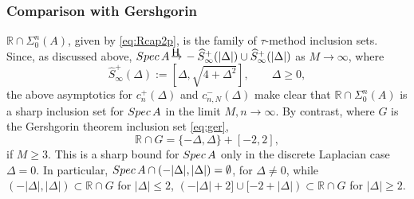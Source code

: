 \documentclass[preprint,1p,11pt]{elsarticle}
\newcommand\R{{\mathbb R}}
\newcommand\Spec{{\rm Spec}\,}  %
\newcommand\Hto{
   \unitlength0.1ex
   \begin{picture}(30,15)
   \put(13,16){\makebox(0,0)[]{\tiny\rm H}}
   \put(15,5){\makebox(0,0)[]{$\to$}}
   \end{picture}
}
\numberwithin{equation}{section}   %
\numberwithin{figure}{section}  %
\begin{document}
\vspace{-2ex}

\subsubsection{Comparison with Gershgorin} \label{sec:T2G} $\R\cap \Sigma_0^n(A)$, given by \eqref{eq:Rcap2p}, is the family of $\tau$-method inclusion sets. Since, as discussed above, $\Spec A \Hto -\widehat S^+_\infty(|\Delta|)\cup \widehat S^+_\infty(|\Delta|)$ as $M\to\infty$, where 
$$
\widehat S^+_\infty(\Delta) := [\Delta, \sqrt{4+\Delta^2}], \qquad \Delta \geq 0,
$$ 
the above asymptotics for $c_n^+(\Delta)$ and $c_{n,N}^-(\Delta)$ make clear that $\R\cap \Sigma_0^n(A)$ is a sharp inclusion set for $\Spec A$ in the limit $M,n\to\infty$. By contrast, where $G$ is the Gershgorin theorem inclusion set  \eqref{eq:ger},
\begin{equation} \label{eq:ger2p}
\R\cap G = \{-\Delta,\Delta\} + [-2,2],
\end{equation}
if $M\geq 3$.
This is a sharp bound for $\Spec A$ only in the discrete Laplacian case $\Delta=0$. In particular, $\Spec A \cap (-|\Delta|,|\Delta|)=\emptyset$, for $\Delta\neq 0$, while $(-|\Delta|,|\Delta|)\subset \R\cap G$ for $|\Delta|\leq 2$, $(-|\Delta|+2] \cup [-2+|\Delta|)\subset \R\cap G$ for $|\Delta|\geq 2$.
\end{document}
